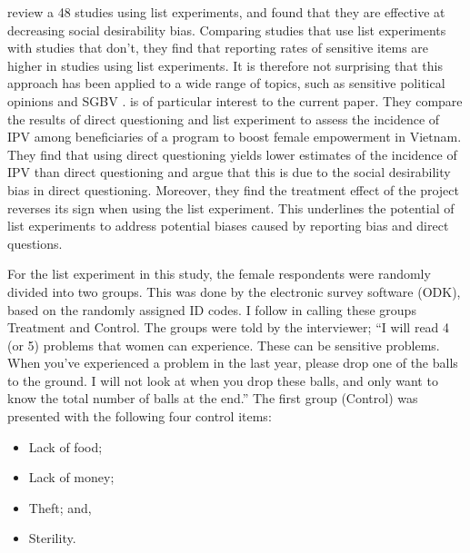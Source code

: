\documentclass[10pt,a4paper]{scrartcl} %
\begin{document}
\cite{Holbrook2010} review a 48 studies using list experiments, and found that they are effective at decreasing social desirability bias. Comparing studies that use list experiments with studies that don't, they find that reporting rates of sensitive items are higher in studies using list experiments. It is therefore not surprising that this approach has been applied to a wide range of topics, such as sensitive political opinions \citep{Frye2017,Blair2014,Meng2017} and SGBV \citep{Bulte2019}. \cite{Bulte2019} is of particular interest to the current paper. They compare the results of direct questioning and list experiment to assess the incidence of IPV among beneficiaries of a program to boost female empowerment in Vietnam. They find that using direct questioning yields lower estimates of the incidence of IPV than direct questioning and argue that this is due to the social desirability bias in direct questioning. Moreover, they find the treatment effect of the project reverses its sign when using the list experiment. This underlines the potential of list experiments to address potential biases caused by reporting bias and direct questions.

For the list experiment in this study, the female respondents were randomly divided into two groups. This was done by the electronic survey software (ODK), based on the randomly assigned ID codes. I follow \cite{Imai2011} in calling these groups Treatment and Control. The groups were told by the interviewer; ``I will read 4 (or 5) problems that women can experience. These can be sensitive problems. When you've experienced a problem in the last year, please drop one of the balls to the ground. I will not look at when you drop these balls, and only want to know the total number of balls at the end.'' The first group (Control) was presented with the following four control items:
\begin{itemize}
	\item Lack of food;
	\item Lack of money;
	\item Theft; and,
	\item Sterility. %
\end{itemize}
\end{document}
